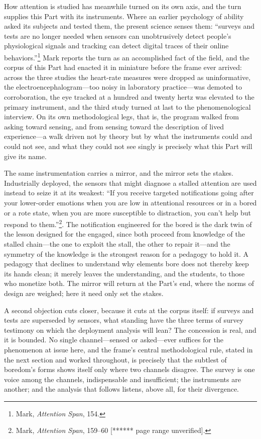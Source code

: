 How attention is studied has meanwhile turned on its own axis, and the turn supplies this Part with its instruments. Where an earlier psychology of ability asked its subjects and tested them, the present science senses them: ``surveys and tests are no longer needed when sensors can unobtrusively detect people's physiological signals and tracking can detect digital traces of their online behaviors.''\footnote{Mark, \textit{Attention Span}, 154.} Mark reports the turn as an accomplished fact of the field, and the corpus of this Part had enacted it in miniature before the frame ever arrived: across the three studies the heart-rate measures were dropped as uninformative, the electroencephalogram---too noisy in laboratory practice---was demoted to corroboration, the eye tracked at a hundred and twenty hertz was elevated to the primary instrument, and the third study turned at last to the phenomenological interview. On its own methodological legs, that is, the program walked from asking toward sensing, and from sensing toward the description of lived experience---a walk driven not by theory but by what the instruments could and could not see, and what they could not see singly is precisely what this Part will give its name.

The same instrumentation carries a mirror, and the mirror sets the stakes. Industrially deployed, the sensors that might diagnose a stalled attention are used instead to seize it at its weakest: ``If you receive targeted notifications going after your lower-order emotions when you are low in attentional resources or in a bored or a rote state, when you are more susceptible to distraction, you can't help but respond to them.''\footnote{Mark, \textit{Attention Span}, 159--60 [****** page range unverified].}. The notification engineered for the bored is the dark twin of the lesson designed for the engaged, since both proceed from knowledge of the stalled chain---the one to exploit the stall, the other to repair it---and the symmetry of the knowledge is the strongest reason for a pedagogy to hold it. A pedagogy that declines to understand why elements bore does not thereby keep its hands clean; it merely leaves the understanding, and the students, to those who monetize both. The mirror will return at the Part's end, where the norms of design are weighed; here it need only set the stakes.

A second objection cuts closer, because it cuts at the corpus itself: if surveys and tests are superseded by sensors, what standing have the three terms of survey testimony on which the deployment analysis will lean? The concession is real, and it is bounded. No single channel---sensed or asked---ever suffices for the phenomenon at issue here, and the frame's central methodological rule, stated in the next section and worked throughout, is precisely that the subtlest of boredom's forms shows itself only where two channels disagree. The survey is one voice among the channels, indispensable and insufficient; the instruments are another; and the analysis that follows listens, above all, for their divergence.

